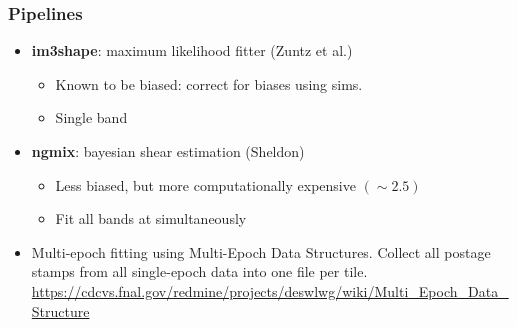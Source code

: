 \documentclass{beamer}
\newcommand{\ngmix}{{\bf ngmix}}
\newcommand{\imshape}{{\bf im3shape}}
\begin{document}
\frame
{
    \frametitle{Pipelines}


    \begin{itemize}
        \item \imshape: maximum likelihood fitter (Zuntz et al.)
            \begin{itemize}
                \item Known to be biased: correct for biases using sims.
                \item Single band
            \end{itemize}
        \item \ngmix: bayesian shear estimation (Sheldon)
            \begin{itemize}
                \item Less biased, but more computationally expensive $(\sim 2.5)$
                \item Fit all bands at simultaneously
            \end{itemize}

        \item Multi-epoch
            fitting using Multi-Epoch Data Structures. Collect all postage
            stamps from all single-epoch data into one file per tile.
            \url{https://cdcvs.fnal.gov/redmine/projects/deswlwg/wiki/Multi_Epoch_Data_Structure}




    \end{itemize}
}
\end{document}
